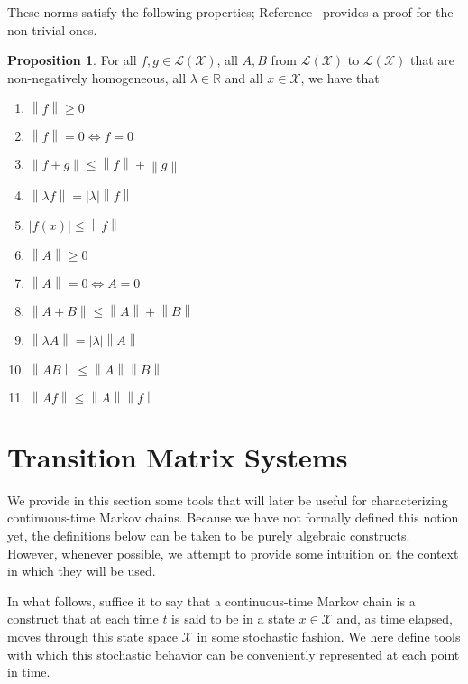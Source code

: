 \documentclass[10pt,a4paper]{paper}
\theoremstyle{definition}
\newtheorem{proposition}[theorem]{Proposition}
\newcommand{\reals}{\mathbb{R}}
\newcommand{\states}{\mathcal{X}}
\newcommand{\gambles}{\mathcal{L}}
\newcommand{\gamblesX}{\gambles(\states)}
\newcommand{\asa}{\Leftrightarrow}
\newcommand{\norm}[1]{\left\lVert #1 \right\rVert}
\newcommand{\abs}[1]{\left\vert #1 \right\vert}
\begin{document}
\noindent These norms satisfy the following properties; Reference~\cite{DeBock:2016} provides a proof for the non-trivial ones.

\begin{proposition}\label{prop:norm_properties}
For all $f,g\in\gamblesX$, all $A,B$ from $\gamblesX$ to $\gamblesX$ that are non-negatively homogeneous, all $\lambda\in\reals$ and all $x\in\states$, we have that
\vspace{5pt}

\begin{multicols}{2}
\begin{enumerate}[label=N\arabic*:,ref=N\arabic*]
\item
$\norm{f}\geq0$
\item
$\norm{f}=0\asa f=0$
\item
$\norm{f+g}\leq\norm{f}+\norm{g}$
\item
$\norm{\lambda f}=\abs{\lambda}\norm{f}$
\item
$\abs{f(x)}\leq\norm{f}$ \\
\item
$\norm{A}\geq0$
\item
$\norm{A}=0\asa A=0$
\item
$\norm{A+B}\leq\norm{A}+\norm{B}$
\item\label{N:homogeneous}
$\norm{\lambda A}=\abs{\lambda}\norm{A}$
\item\label{N:normAB}
$\norm{AB}\leq\norm{A}\norm{B}$
\item\label{N:normAf}
$\norm{Af}\leq\norm{A}\norm{f}$
\end{enumerate}
\end{multicols}
\end{proposition}

\section{Transition Matrix Systems}\label{sec:systems}

We provide in this section some tools that will later be useful for characterizing continuous-time Markov chains. Because we have not formally defined this notion yet, the definitions below can be taken to be purely algebraic constructs. However, whenever possible, we attempt to provide some intuition on the context in which they will be used.

In what follows, suffice it to say that a continuous-time Markov chain is a construct that at each time $t$ is said to be in a state $x\in\states$ and, as time elapsed, moves through this state space $\states$ in some stochastic fashion. We here define tools with which this stochastic behavior can be conveniently represented at each point in time.
\end{document}
